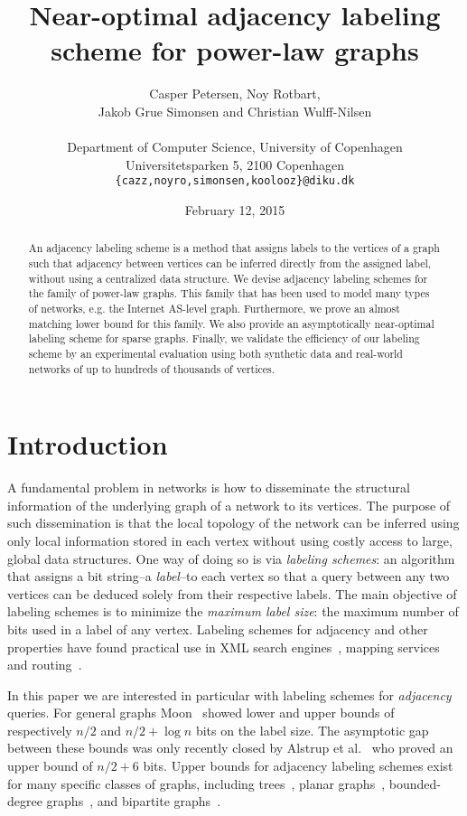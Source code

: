 \documentclass{article}
\date{February 12, 2015}
\title{Near-optimal adjacency labeling scheme for power-law graphs}
\author{Casper Petersen, Noy Rotbart,\\ Jakob Grue Simonsen and Christian Wulff-Nilsen \\ \\
\small{Department of Computer Science, University of Copenhagen} \\
\small{Universitetsparken 5, 2100 Copenhagen}\\
 \small{\texttt{\{cazz,noyro,simonsen,koolooz\}@diku.dk}} \\
}
\theoremstyle{remark}
\begin{document}
\begin{titlepage}
\clearpage\maketitle
\thispagestyle{empty}
\begin{abstract}
An adjacency labeling scheme is a method that assigns labels to the vertices of a graph such that adjacency between vertices 
can be inferred directly from the assigned label, without using a  centralized data structure.
We devise adjacency labeling schemes for  the family  of power-law graphs. This  family that  has been used to model many types of networks, e.g. the Internet AS-level graph. Furthermore, we  prove an almost matching  lower bound for this family.
We also provide an asymptotically near-optimal  labeling scheme for sparse graphs.
Finally, we validate the efficiency of our labeling scheme by  an experimental evaluation  using both synthetic data and real-world networks of up to hundreds of thousands of vertices. 

\end{abstract}
\end{titlepage}
\newpage
\section{Introduction}
A fundamental problem in networks is how to disseminate the structural information of the underlying graph of a network to its vertices. The purpose of such dissemination is that the local topology of the network can be inferred using only local information stored in each vertex without using costly access to large, global data structures.
One way of doing so is via  \emph{ labeling schemes}: an algorithm that assigns a bit string--a \emph{label}--to each vertex so that a query between any two vertices can be deduced solely from their respective labels. 
The main objective of  labeling schemes is to minimize the \emph{maximum label size}: the maximum number of bits used in a label of any vertex. 
Labeling schemes for adjacency and other properties have found practical use in  XML search engines~\cite{cohen2010labeling}, mapping services~\cite{abraham2011hub} and routing~\cite{krioukov2004compact}.

In this paper we are interested in particular with labeling schemes for   \emph{adjacency} queries. 
For general graphs Moon~\cite{moon1965minimal} showed lower and upper bounds of respectively $n/2$ and $n/2+\log n$ bits on the  label size.
The asymptotic gap between these bounds was only recently closed  by Alstrup et al.~\cite{alstrup2014adjacency} who proved an upper bound of $n/2 + 6$ bits. 
Upper bounds for adjacency labeling schemes exist for many specific classes of graphs, including trees~\cite{Alstrup02}, planar graphs~\cite{gavoille2007shorter},  bounded-degree graphs~\cite{adjiashvili2014labeling}, and bipartite graphs~\cite{lozin2007minimal}.
\end{document}
